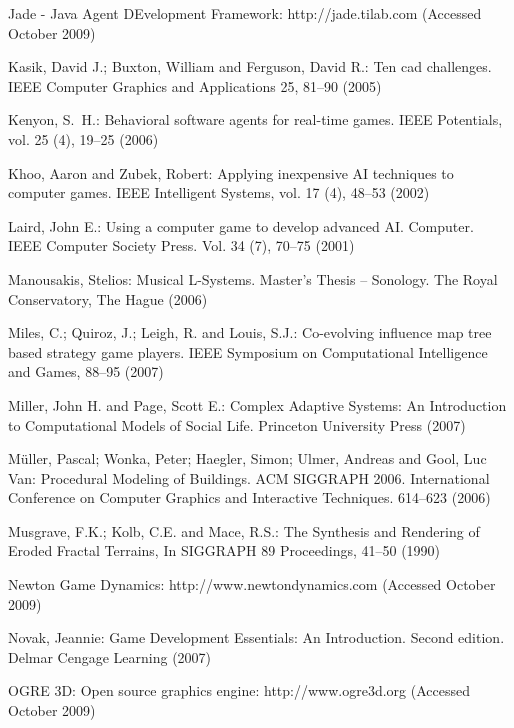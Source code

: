 \documentclass[twocolumn]{svjour3}
\begin{document}
\begin{thebibliography}{0}
\begin{flushleft}
Jade - Java Agent DEvelopment Framework:
http://jade.tilab.com
(Accessed October 2009)
\end{flushleft}

Kasik, David J.; Buxton, William and Ferguson, David R.:
Ten cad challenges.
IEEE Computer Graphics and Applications 25, 81--90 (2005)

Kenyon, S.~H.:
Behavioral software agents for real-time games.
IEEE Potentials, vol. 25 (4), 19--25 (2006)

Khoo, Aaron and Zubek, Robert:
Applying inexpensive AI techniques to computer games.
IEEE Intelligent Systems, vol. 17 (4), 48--53 (2002)

Laird, John E.:
Using a computer game to develop advanced AI.
Computer. IEEE Computer Society Press. Vol. 34 (7), 70--75 (2001)

Manousakis, Stelios:
Musical L-Systems.
Master’s Thesis – Sonology. The Royal Conservatory, The Hague (2006)

Miles, C.; Quiroz, J.; Leigh, R. and Louis, S.J.:
Co-evolving influence map tree based strategy game players.
IEEE Symposium on Computational Intelligence and Games, 88--95 (2007)

Miller, John H. and Page, Scott E.:
Complex Adaptive Systems: An Introduction to Computational Models of Social Life.
Princeton University Press (2007)

Müller, Pascal; Wonka, Peter; Haegler, Simon; Ulmer, Andreas and Gool, Luc Van:
Procedural Modeling of Buildings.
ACM SIGGRAPH 2006. International Conference on Computer Graphics and Interactive Techniques. 614--623 (2006)

Musgrave, F.K.; Kolb, C.E. and Mace, R.S.:
The Synthesis and Rendering of Eroded Fractal Terrains,
In SIGGRAPH 89 Proceedings, 41--50 (1990)

Newton Game Dynamics:
http://www.newtondynamics.com
(Accessed October 2009)

Novak, Jeannie:
Game Development Essentials: An Introduction. Second edition.
Delmar Cengage Learning (2007)

\begin{flushleft}
OGRE 3D: Open source graphics engine:
http://www.ogre3d.org
(Accessed October 2009)
\end{flushleft}


\end{thebibliography}
\end{document}
